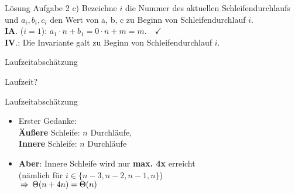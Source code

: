 \begin{frame}{Lösung Aufgabe 2 c)}
	Bezeichne $i$ die Nummer des aktuellen Schleifendurchlaufs und $a_i, b_i, c_i$ den Wert von a, b, c zu Beginn von Schleifendurchlauf $i$. \\
	\pause
	\hanging \textbf{IA}. ($i=1$): \quad $a_1 \cdot n + b_1 = 0 \cdot n + m = m. \quad \checkmark$ \\
	\pause
	\hanging \textbf{IV}.: Die Invariante galt zu Beginn von Schleifendurchlauf $i$. \\
	\pause
\end{frame}


\begin{frame}{Laufzeitabschätzung}
	\begin{exampleblock}{Laufzeit?}
		\begin{algorithm}[H]
		\end{algorithm}
	\end{exampleblock}
\end{frame}

\begin{frame}{Laufzeitabschätzung}
	\begin{itemize}
		\item Erster Gedanke: \\ 
		\textbf{Äußere} Schleife: $n$ Durchläufe, \\ 
		\textbf{Innere} Schleife: $n$ Durchläufe \\ 
		\only<1|handout:0>{$\impl \Theta(n \cdot n) = \Theta(n^2)$}
		\only<2>{$\xcancel{\impl \Theta(n \cdot n) = \Theta(n^2)}$}
		\pause
		\item \textbf{Aber}: Innere Schleife wird nur \textbf{max. 4x} erreicht \\ (nämlich für $i \in \{n-3, n-2, n-1, n\}$) \\
		$\impl \Theta(n + 4n) = \Theta(n)$
	\end{itemize}
\end{frame}


